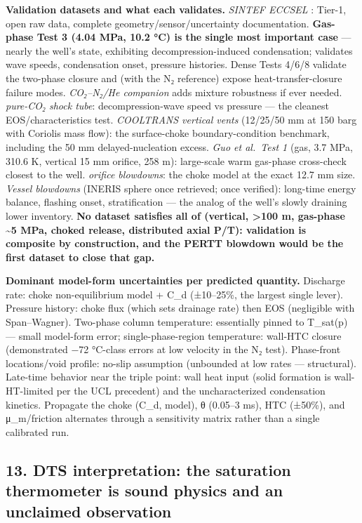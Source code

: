 \textbf{Validation datasets and what each validates.} \emph{SINTEF ECCSEL} \citep{munkejord2020,sintef2020data}:
Tier-1, open raw data, complete geometry/sensor/uncertainty
documentation. \textbf{Gas-phase Test 3 (4.04 MPa, 10.2 °C) is the
single most important case} --- nearly the well's state, exhibiting
decompression-induced condensation; validates wave speeds, condensation
onset, pressure histories. Dense Tests 4/6/8 validate the two-phase
closure and (with the N₂ reference) expose heat-transfer-closure failure
modes. \emph{CO₂--N₂/He companion} \citep{munkejord2021,sintef2021data} adds mixture robustness if ever needed.
\emph{\citet{botros2016} pure-CO₂ shock tube}:
decompression-wave speed vs pressure --- the cleanest
EOS/characteristics test. \emph{COOLTRANS vertical vents} (12/25/50 mm
at 150 barg with Coriolis mass flow): the surface-choke
boundary-condition benchmark, including the 50 mm delayed-nucleation
excess. \emph{Guo et al.~Test 1} (gas, 3.7 MPa, 310.6 K, vertical 15 mm
orifice, 258 m): large-scale warm gas-phase cross-check closest to the
well. \emph{\citet{hammer2022} orifice blowdowns}: the choke model at
the exact 12.7 mm size. \emph{Vessel blowdowns} (INERIS sphere once retrieved; \citealp{gebbeken1996} once verified): long-time energy balance,
flashing onset, stratification --- the analog of the well's slowly
draining lower inventory. \textbf{No dataset satisfies all of (vertical,
\textgreater100 m, gas-phase \textasciitilde5 MPa, choked release,
distributed axial P/T): validation is composite by construction, and the
PERTT blowdown would be the first dataset to close that gap.}

\textbf{Dominant model-form uncertainties per predicted quantity.}
Discharge rate: choke non-equilibrium model + C\_d (±10--25\%, the
largest single lever). Pressure history: choke flux (which sets drainage
rate) then EOS (negligible with Span--Wagner). Two-phase column
temperature: essentially pinned to T\_sat(p) --- small model-form error;
single-phase-region temperature: wall-HTC closure (demonstrated −72
°C-class errors at low velocity in the N₂ test). Phase-front
locations/void profile: no-slip assumption (unbounded at low rates ---
structural). Late-time behavior near the triple point: wall heat input
(solid formation is wall-HT-limited per the UCL precedent) and the
uncharacterized condensation kinetics. Propagate the choke (C\_d,
model), θ (0.05--3 ms), HTC (±50\%), and μ\_m/friction alternates
through a sensitivity matrix rather than a single calibrated run.

\hypertarget{dts-interpretation-the-saturation-thermometer-is-sound-physics-and-an-unclaimed-observation}{%
\subsection{13. DTS interpretation: the saturation thermometer is sound
physics and an unclaimed
observation}\label{dts-interpretation-the-saturation-thermometer-is-sound-physics-and-an-unclaimed-observation}}

